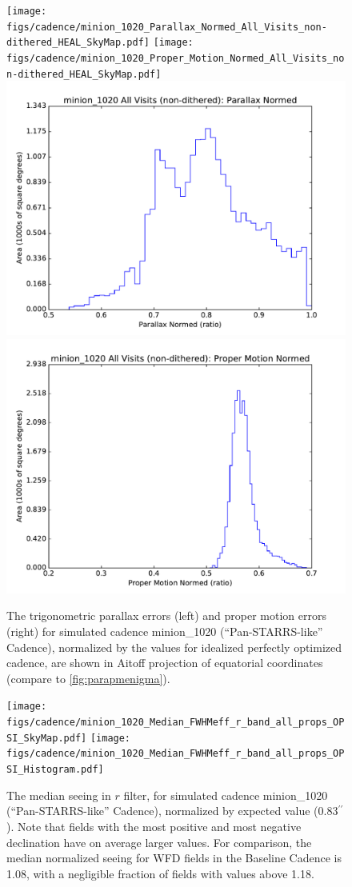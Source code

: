 \begin{figure}[t!]
\vskip -0.03in
\texttt{[image: figs/cadence/minion\_1020\_Parallax\_Normed\_All\_Visits\_non-dithered\_HEAL\_SkyMap.pdf]}
\texttt{[image: figs/cadence/minion\_1020\_Proper\_Motion\_Normed\_All\_Visits\_non-dithered\_HEAL\_SkyMap.pdf]}
\includegraphics[angle=0,width=0.49\hsize:,clip]{figs/cadence/minion_1020_Parallax_Normed_All_Visits_non-dithered_HEAL_Histogram.pdf}
\includegraphics[angle=0,width=0.49\hsize:,clip]{figs/cadence/minion_1020_Proper_Motion_Normed_All_Visits_non-dithered_HEAL_Histogram.pdf}
\vskip -0.2in
\caption{The trigonometric parallax errors (left) and proper motion errors (right) for simulated cadence
minion\_1020 (``Pan-STARRS-like'' Cadence), normalized by the values for idealized perfectly optimized
cadence, are shown in Aitoff projection of equatorial coordinates (compare to \autoref{fig:parapmenigma}).}
\label{fig:parapmenigma2}
\end{figure}

\begin{figure}[t!]
\vskip -0.03in
\texttt{[image: figs/cadence/minion\_1020\_Median\_FWHMeff\_r\_band\_all\_props\_OPSI\_SkyMap.pdf]}
\texttt{[image: figs/cadence/minion\_1020\_Median\_FWHMeff\_r\_band\_all\_props\_OPSI\_Histogram.pdf]}
\vskip -0.2in
\caption{The median seeing in $r$ filter, for simulated cadence minion\_1020 (``Pan-STARRS-like'' Cadence),
normalized by expected value (0.83$^{\prime\prime}$). Note that fields with the most positive and most negative
declination have on average larger values. For comparison, the median normalized seeing for WFD fields
in the Baseline Cadence is 1.08, with a negligible fraction of fields with values above 1.18.}
\label{fig:PS-seeing}
\end{figure}



